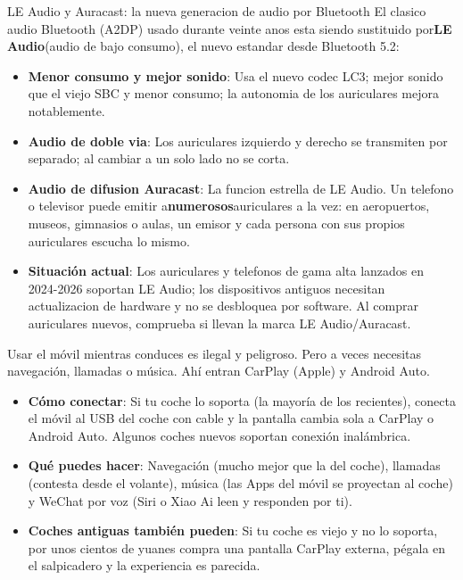 \begin{tcbinfo}{LE Audio y Auracast: la nueva generacion de audio por Bluetooth}
El clasico audio Bluetooth (A2DP) usado durante veinte anos esta siendo sustituido por\textbf{LE Audio}(audio de bajo consumo), el nuevo estandar desde Bluetooth 5.2:

\begin{itemize}
  \item \textbf{Menor consumo y mejor sonido}: Usa el nuevo codec LC3; mejor sonido que el viejo SBC y menor consumo; la autonomia de los auriculares mejora notablemente.
  \item \textbf{Audio de doble via}: Los auriculares izquierdo y derecho se transmiten por separado; al cambiar a un solo lado no se corta.
  \item \textbf{Audio de difusion Auracast}: La funcion estrella de LE Audio. Un telefono o televisor puede emitir a\textbf{numerosos}auriculares a la vez: en aeropuertos, museos, gimnasios o aulas, un emisor y cada persona con sus propios auriculares escucha lo mismo.
  \item \textbf{Situación actual}: Los auriculares y telefonos de gama alta lanzados en 2024-2026 soportan LE Audio; los dispositivos antiguos necesitan actualizacion de hardware y no se desbloquea por software. Al comprar auriculares nuevos, comprueba si llevan la marca LE Audio/Auracast.
\end{itemize}

\end{tcbinfo}


Usar el móvil mientras conduces es ilegal y peligroso. Pero a veces necesitas navegación, llamadas o música. Ahí entran CarPlay (Apple) y Android Auto.

\begin{itemize}
  \item \textbf{Cómo conectar}: Si tu coche lo soporta (la mayoría de los recientes), conecta el móvil al USB del coche con cable y la pantalla cambia sola a CarPlay o Android Auto. Algunos coches nuevos soportan conexión inalámbrica.
  \item \textbf{Qué puedes hacer}: Navegación (mucho mejor que la del coche), llamadas (contesta desde el volante), música (las Apps del móvil se proyectan al coche) y WeChat por voz (Siri o Xiao Ai leen y responden por ti).
  \item \textbf{Coches antiguas también pueden}: Si tu coche es viejo y no lo soporta, por unos cientos de yuanes compra una pantalla CarPlay externa, pégala en el salpicadero y la experiencia es parecida.
\end{itemize}


